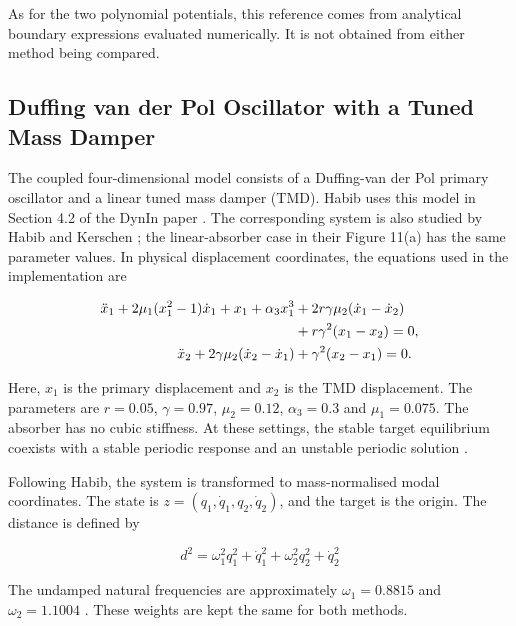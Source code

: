As for the two polynomial potentials, this reference comes from analytical boundary expressions evaluated numerically. It is not obtained from either method being compared.

\subsection{Duffing van der Pol Oscillator with a Tuned Mass Damper}

The coupled four-dimensional model consists of a Duffing-van der Pol primary oscillator and a linear tuned mass damper (TMD). Habib uses this model in Section 4.2 of the DynIn paper \cite{ref12}. The corresponding system is also studied by Habib and Kerschen \cite{ref15}; the linear-absorber case in their Figure 11(a) has the same parameter values. In physical displacement coordinates, the equations used in the implementation are

\begin{align}
\ddot{x}_1 + 2\mu_1(x_1^2-1)\dot{x}_1 + x_1 + \alpha_3 x_1^3
&+2r\gamma\mu_2(\dot{x}_1-\dot{x}_2) \notag\\
&+r\gamma^2(x_1-x_2)=0,\\
\ddot{x}_2+2\gamma\mu_2(\dot{x}_2-\dot{x}_1)
&+\gamma^2(x_2-x_1)=0.
\end{align}

Here, ${x}_{1}$ is the primary displacement and ${x}_{2}$ is the TMD displacement. The parameters are $r=0.05$, $\gamma =0.97$, ${\mu }_{2}=0.12$, ${\alpha }_{3}=0.3$ and ${\mu }_{1}=0.075$. The absorber has no cubic stiffness. At these settings, the stable target equilibrium coexists with a stable periodic response and an unstable periodic solution \cite{ref12,ref15}.

\begin{revision}
Following Habib, the system is transformed to mass-normalised modal coordinates. The state is $z=({q}_{1},{\dot{q}}_{1},{q}_{2},{\dot{q}}_{2})$, and the target is the origin. The distance is defined by
\end{revision}

\begin{equation}
  {d}^{2} = {\omega }_{1}^{2}{q}_{1}^{2} + {\dot{q}}_{1}^{2} + {\omega }_{2}^{2}{q}_{2}^{2} + {\dot{q}}_{2}^{2}
\end{equation}

The undamped natural frequencies are approximately ${\omega }_{1}=0.8815$ and ${\omega }_{2}=1.1004$ \cite{ref12}. These weights are kept the same for both methods.


